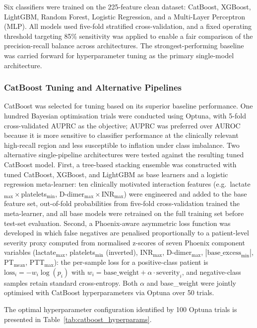 \documentclass[final,3p,times]{elsarticle}
\begin{document}
Six classifiers were trained on the 225-feature clean dataset:
CatBoost, XGBoost, LightGBM, Random Forest, Logistic Regression,
and a Multi-Layer Perceptron (MLP). All models used five-fold
stratified cross-validation, and a fixed operating threshold
targeting 85\% sensitivity was applied to enable a fair comparison
of the precision-recall balance across architectures. The
strongest-performing baseline was carried forward for hyperparameter
tuning as the primary single-model architecture.

\subsubsection{CatBoost Tuning and Alternative Pipelines}
\label{subsec:catboost_methods}

CatBoost was selected for tuning based on its superior baseline
performance. One hundred Bayesian optimisation trials were
conducted using Optuna, with 5-fold cross-validated AUPRC as the
objective; AUPRC was preferred over AUROC because it is more
sensitive to classifier performance at the clinically relevant
high-recall region and less susceptible to inflation under class
imbalance. Two alternative single-pipeline architectures were
tested against the resulting tuned CatBoost model. First, a
tree-based stacking ensemble was constructed with tuned CatBoost,
XGBoost, and LightGBM as base learners and a logistic regression
meta-learner: ten clinically motivated interaction features (e.g.\
lactate$_{\max}\times$platelets$_{\min}$, D-dimer$_{\max}\times$INR$_{\max}$)
were engineered and added to the base feature set, out-of-fold
probabilities from five-fold cross-validation trained the
meta-learner, and all base models were retrained on the full
training set before test-set evaluation. Second, a Phoenix-aware
asymmetric loss function was developed in which false negatives are
penalised proportionally to a patient-level severity proxy computed
from normalised z-scores of seven Phoenix component variables
(lactate$_{\max}$, platelets$_{\min}$ (inverted), INR$_{\max}$,
D-dimer$_{\max}$, $|\text{base\_excess}_{\min}|$, PT$_{\text{mean}}$,
PTT$_{\max}$): the per-sample loss for a positive-class patient is
$\text{loss}_i = -w_i\log(p_i)$ with $w_i = \text{base\_weight} +
\alpha\cdot\text{severity}_i$, and negative-class samples retain
standard cross-entropy. Both $\alpha$ and base\_weight were jointly
optimised with CatBoost hyperparameters via Optuna over 50 trials.

The optimal hyperparameter configuration identified by 100 Optuna
trials is presented in Table~\ref{tab:catboost_hyperparams}.
\end{document}
